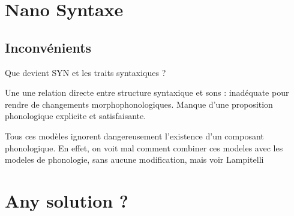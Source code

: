   \section{Nano Syntaxe}
    \subsection{Inconv\'enients}
    Que devient SYN et les traits syntaxiques ?
    
    Une une relation directe entre structure syntaxique et sons : inad\'equate pour rendre de changements morphophonologiques. Manque d'une proposition phonologique explicite et satisfaisante. 
    
    Tous ces mod\`eles ignorent dangereusement l'existence d'un composant phonologique. En effet, on voit mal comment combiner ces modeles avec les modeles de phonologie, sans aucune modification, mais voir Lampitelli
  \section{Any solution ?}
